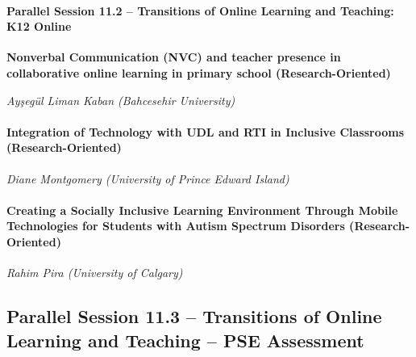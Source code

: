 \documentclass[
]{book}
\begin{document}
\begin{secondary}
\hypertarget{parallel-session-11.2-transitions-of-online-learning-and-teaching-k12-online}{%
\paragraph{Parallel Session 11.2 -- Transitions of Online Learning and
Teaching: K12
Online}\label{parallel-session-11.2-transitions-of-online-learning-and-teaching-k12-online}}

\textbf{Nonverbal Communication (NVC) and teacher presence in
collaborative online learning in primary school (Research-Oriented)}

\emph{Ayşegül Liman Kaban (Bahcesehir University)}
\end{secondary}

\begin{secondary}
\hypertarget{integration-of-technology-with-udl-and-rti-in-inclusive-classrooms-research-oriented}{%
\paragraph{Integration of Technology with UDL and RTI in Inclusive
Classrooms
(Research-Oriented)}\label{integration-of-technology-with-udl-and-rti-in-inclusive-classrooms-research-oriented}}

\emph{Diane Montgomery (University of Prince Edward Island)}
\end{secondary}
\begin{secondary}
\hypertarget{creating-a-socially-inclusive-learning-environment-through-mobile-technologies-for-students-with-autism-spectrum-disorders-research-oriented}{%
\paragraph{Creating a Socially Inclusive Learning Environment Through
Mobile Technologies for Students with Autism Spectrum Disorders
(Research-Oriented)}\label{creating-a-socially-inclusive-learning-environment-through-mobile-technologies-for-students-with-autism-spectrum-disorders-research-oriented}}

\emph{Rahim Pira (University of Calgary)}
\end{secondary}

\hypertarget{parallel-session-11.3-transitions-of-online-learning-and-teaching-pse-assessment}{%
\subsection*{Parallel Session 11.3 -- Transitions of Online Learning and Teaching -- PSE Assessment}\label{parallel-session-11.3-transitions-of-online-learning-and-teaching-pse-assessment}}
\end{document}
